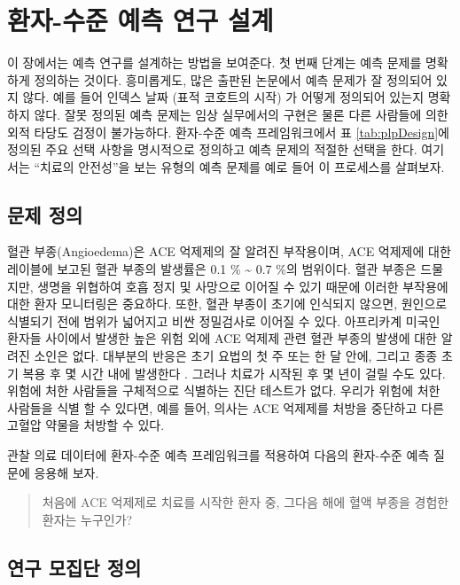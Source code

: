\documentclass[11pt]{book}
\theoremstyle{definition}
\theoremstyle{definition}
\theoremstyle{definition}
\theoremstyle{remark}
\begin{document}
\section{환자-수준 예측 연구 설계}\label{----}

이 장에서는 예측 연구를 설계하는 방법을 보여준다. 첫 번째 단계는 예측
문제를 명확하게 정의하는 것이다. 흥미롭게도, 많은 출판된 논문에서 예측
문제가 잘 정의되어 있지 않다. 예를 들어 인덱스 날짜 (표적 코호트의 시작)
가 어떻게 정의되어 있는지 명확하지 않다. 잘못 정의된 예측 문제는 임상
실무에서의 구현은 물론 다른 사람들에 의한 외적 타당도 검정이 불가능하다.
환자-수준 예측 프레임워크에서 표 \ref{tab:plpDesign}에 정의된 주요 선택
사항을 명시적으로 정의하고 예측 문제의 적절한 선택을 한다. 여기서는
``치료의 안전성''을 보는 유형의 예측 문제를 예로 들어 이 프로세스를
살펴보자. 

\subsection{문제 정의}\label{--3}

혈관 부종(Angioedema)은 ACE 억제제의 잘 알려진 부작용이며, ACE 억제제에
대한 레이블에 보고된 혈관 부종의 발생률은 0.1 \% \textasciitilde{} 0.7
\%의 범위이다. \citep{byrd_2006} 혈관 부종은 드물지만, 생명을 위협하여
호흡 정지 및 사망으로 이어질 수 있기 때문에 이러한 부작용에 대한 환자
모니터링은 중요하다. \citep{norman_2013} 또한, 혈관 부종이 초기에
인식되지 않으면, 원인으로 식별되기 전에 범위가 넓어지고 비싼 정밀검사로
이어질 수 있다. \citep{norman_2013, thompson_1993} 아프리카계 미국인
환자들 사이에서 발생한 높은 위험 외에 ACE 억제제 관련 혈관 부종의 발생에
대한 알려진 소인은 없다. \citep{byrd_2006} 대부분의 반응은 초기 요법의
첫 주 또는 한 달 안에, 그리고 종종 초기 복용 후 몇 시간 내에 발생한다
\citep{circardi_2004}. 그러나 치료가 시작된 후 몇 년이 걸릴 수도 있다.
\citep{mara_1996} 위험에 처한 사람들을 구체적으로 식별하는 진단 테스트가
없다. 우리가 위험에 처한 사람들을 식별 할 수 있다면, 예를 들어, 의사는
ACE 억제제를 처방을 중단하고 다른 고혈압 약물을 처방할 수
있다. 

관찰 의료 데이터에 환자-수준 예측 프레임워크를 적용하여 다음의 환자-수준
예측 질문에 응용해 보자.

\begin{quote}
처음에 ACE 억제제로 치료를 시작한 환자 중, 그다음 해에 혈액 부종을
경험한 환자는 누구인가?
\end{quote}

\subsection{연구 모집단 정의}\label{--}
\end{document}
